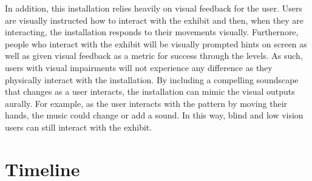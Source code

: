 \documentclass[10pt,twocolumn]{article}
\begin{document}
In addition, this installation relies heavily on visual feedback for the user.  Users are visually instructed how to interact with the exhibit and then, when they are interacting, the installation responds to their movements visually.  Furthernore, people who interact with the exhibit will be visually prompted hints on screen as well as given visual feedback as a metric for success through the levels. As such, users with visual impairments will not experience any difference as they physically interact with the installation. By including a compelling soundscape that changes as a user interacts, the installation can mimic the visual outputs aurally. For example, as the user interacts with the pattern by moving their hands, the music could change or add a sound.  In this way, blind and low vision users can still interact with the exhibit. 

\section{Timeline}

\printbibliography 
\end{document}
